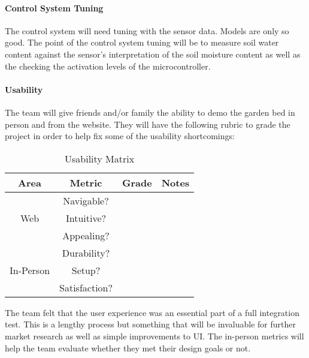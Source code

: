 \paragraph{Control System Tuning}
The control system will need tuning with the sensor data. Models are only so good. The point of the control system tuning will be to measure soil water content against the sensor's interpretation of the soil moisture content as well as the checking the activation levels of the microcontroller. 

\paragraph{Usability}
The team will give friends and/or family the ability to demo the garden bed in person and from the website. They will have the following rubric to grade the project in order to help fix some of the usability shortcomings:

\begin{table}[H]
    \centering
    \caption{Usability Matrix}
    \begin{tabular}{|c|c|c|c|}
        \hline
        \textbf{Area} & \textbf{Metric} & \textbf{Grade} & \textbf{Notes} \\
        \hline
        \multirow{3}{*}{Web} & Navigable? & &\\
                        & Intuitive? & &\\
                        & Appealing? & &\\
        \hline
        \multirow{3}{*}{In-Person} & Durability? & & \\
                                & Setup? & & \\
                                & Satisfaction? & & \\
        \hline
    \end{tabular}
    \label{table:usability-matrix}
\end{table}

The team felt that the user experience was an essential part of a full integration test. This is a lengthy process but something that will be invaluable for further market research as well as simple improvements to UI. The in-person metrics will help the team evaluate whether they met their design goals or not.

